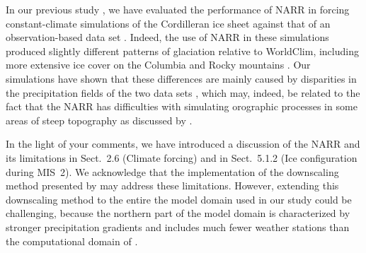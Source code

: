 In our previous study \citep{Seguinot.etal.2014}, we have evaluated the
performance of NARR in forcing constant-climate simulations of the Cordilleran
ice sheet against that of an observation-based data set
\citep[WorldClim]{Hijmans.etal.2005}. Indeed, the use of NARR in these
simulations produced slightly different patterns of glaciation relative to
WorldClim, including more extensive ice cover on the Columbia and Rocky
mountains \citep[Figs.~6--7]{Seguinot.etal.2014}. Our simulations have shown
that these differences are mainly caused by disparities in the precipitation
fields of the two data sets \citep[Figs.13--14]{Seguinot.etal.2014}, which may,
indeed, be related to the fact that the NARR has difficulties with simulating
orographic processes in some areas of steep topography as discussed by
\citet{Jarosch.etal.2012}.

In the light of your comments, we have introduced a discussion of the NARR and
its limitations in Sect.~2.6 (Climate forcing) and in Sect.~5.1.2 (Ice
configuration during MIS~2). We acknowledge that the implementation of the
downscaling method presented by \citet{Jarosch.etal.2012} may address these
limitations. However, extending this downscaling method to the entire the model
domain used in our study could be challenging, because the northern part of the
model domain is characterized by stronger precipitation gradients and includes
much fewer weather stations than the computational domain of
\citet{Jarosch.etal.2012}.


